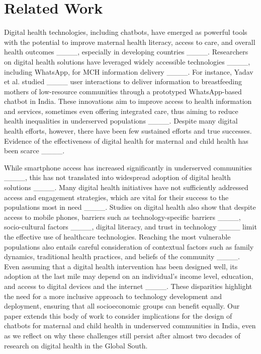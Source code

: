 \section{Related Work}
Digital health technologies, including chatbots, have emerged as powerful tools with the potential to improve maternal health literacy, access to care, and overall health outcomes ____, especially in developing countries ____. Researchers on digital health solutions have leveraged widely accessible technologies ____, including WhatsApp, for MCH information delivery ____. For instance, Yadav et al. studied ____ user interactions to deliver information to breastfeeding mothers of low-resource communities through a prototyped WhatsApp-based chatbot in India.
These innovations aim to improve access to health information and services, sometimes even offering integrated care, thus aiming to reduce health inequalities in underserved populations ____. 
Despite many digital health efforts, however, there have been few sustained efforts and true successes. Evidence of the effectiveness of digital health for maternal and child health has been scarce ____.

While smartphone access has increased significantly in underserved communities ____, this has not translated into widespread adoption of digital health solutions ____.
Many digital health initiatives have not sufficiently addressed access and engagement strategies, which are vital for their success to the populations most in need ____. 
Studies on digital health also show that despite access to mobile phones, barriers such as technology-specific barriers ____, socio-cultural factors ____, digital literacy, and trust in technology ____ limit the effective use of healthcare technologies. 
Reaching the most vulnerable populations also entails careful consideration of contextual factors such as family dynamics, traditional health practices, and beliefs of the community ____. 
Even assuming that a digital health intervention has been designed well, its adoption at the last mile may depend on an individual's income level, education, and access to digital devices and the internet ____.  
These disparities highlight the need for a more inclusive approach to technology development and deployment, ensuring that all socioeconomic groups can benefit equally. 
Our paper extends this body of work to consider implications for the design of chatbots for maternal and child health in underserved communities in India, even as we reflect on why these challenges still persist after almost two decades of research on digital health in the Global South. 
 
